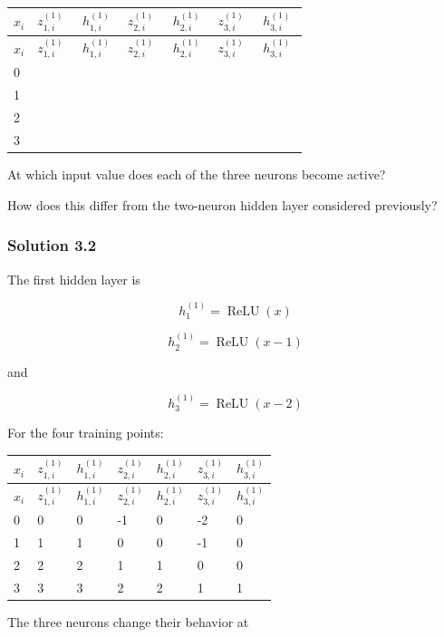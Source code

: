 \documentclass[10pt]{article}
\begin{document}
\begingroup
\small
\setlength{\tabcolsep}{4pt}
\begin{longtable}{l|l|l|l|l|l|l}
$x_i$ & $z^{(1)}_{1,i}$ & $h^{(1)}_{1,i}$ & $z^{(1)}_{2,i}$ & $h^{(1)}_{2,i}$ & $z^{(1)}_{3,i}$ & $h^{(1)}_{3,i}$ \\[1.5pt]
\hline
\endfirsthead
$x_i$ & $z^{(1)}_{1,i}$ & $h^{(1)}_{1,i}$ & $z^{(1)}_{2,i}$ & $h^{(1)}_{2,i}$ & $z^{(1)}_{3,i}$ & $h^{(1)}_{3,i}$ \\[1.5pt]
\hline
\endhead
\rule{0pt}{2.4ex}0 &  $\phantom{-0.00}$ &  $\phantom{-0.00}$ &  $\phantom{-0.00}$ &  $\phantom{-0.00}$ &  $\phantom{-0.00}$ &  $\phantom{-0.00}$ \\[3pt]
\rule{0pt}{2.4ex}1 &  $\phantom{-0.00}$ &  $\phantom{-0.00}$ &  $\phantom{-0.00}$ &  $\phantom{-0.00}$ &  $\phantom{-0.00}$ &  $\phantom{-0.00}$ \\[3pt]
\rule{0pt}{2.4ex}2 &  $\phantom{-0.00}$ &  $\phantom{-0.00}$ &  $\phantom{-0.00}$ &  $\phantom{-0.00}$ &  $\phantom{-0.00}$ &  $\phantom{-0.00}$ \\[3pt]
\rule{0pt}{2.4ex}3 &  $\phantom{-0.00}$ &  $\phantom{-0.00}$ &  $\phantom{-0.00}$ &  $\phantom{-0.00}$ &  $\phantom{-0.00}$ &  $\phantom{-0.00}$ \\[3pt]
\end{longtable}
\endgroup
At which input value does each of the three neurons become active?

How does this differ from the two-neuron hidden layer considered previously?

\begingroup\color{red}

\subsubsection*{Solution 3.2}
The first hidden layer is

\[
h^{(1)}_1=\operatorname{ReLU}(x)
\]

\[
h^{(1)}_2=\operatorname{ReLU}(x-1)
\]

and

\[
h^{(1)}_3=\operatorname{ReLU}(x-2)
\]

For the four training points:

\begingroup
\small
\setlength{\tabcolsep}{4pt}
\begin{longtable}{l|l|l|l|l|l|l}
$x_i$ & $z^{(1)}_{1,i}$ & $h^{(1)}_{1,i}$ & $z^{(1)}_{2,i}$ & $h^{(1)}_{2,i}$ & $z^{(1)}_{3,i}$ & $h^{(1)}_{3,i}$ \\[1.5pt]
\hline
\endfirsthead
$x_i$ & $z^{(1)}_{1,i}$ & $h^{(1)}_{1,i}$ & $z^{(1)}_{2,i}$ & $h^{(1)}_{2,i}$ & $z^{(1)}_{3,i}$ & $h^{(1)}_{3,i}$ \\[1.5pt]
\hline
\endhead
0 & 0 & 0 & -1 & 0 & -2 & 0 \\[1.5pt]
1 & 1 & 1 & 0 & 0 & -1 & 0 \\[1.5pt]
2 & 2 & 2 & 1 & 1 & 0 & 0 \\[1.5pt]
3 & 3 & 3 & 2 & 2 & 1 & 1 \\[1.5pt]
\end{longtable}
\endgroup
The three neurons change their behavior at
\end{document}

